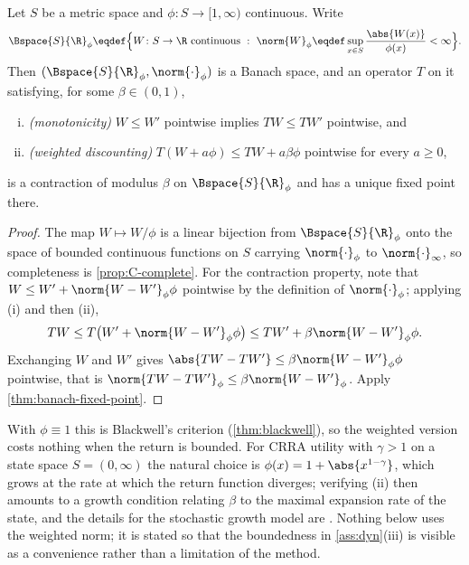 \begin{theorem}\label{thm:weighted-contraction}
	Let $S$ be a metric space and $\phi\colon S\to[1,\infty)$ continuous. Write
	\[
		\Bspace{S}{\R}_{\phi}\eqdef\Bigl\{W\colon S\to\R\ \text{continuous}\ :\
		\norm{W}_{\phi}\eqdef\sup_{x\in S}\frac{\abs{W(x)}}{\phi(x)}<\infty\Bigr\}.
	\]
	Then $(\Bspace{S}{\R}_{\phi},\norm{\cdot}_{\phi})$ is a Banach space, and an
	operator $T$ on it satisfying, for some $\beta\in(0,1)$,
	\begin{enumerate}[(i)]
		\item \emph{(monotonicity)} $W\leq W'$ pointwise implies $TW\leq TW'$
		      pointwise, and
		\item \emph{(weighted discounting)} $T(W+a\phi)\leq TW+a\beta\phi$ pointwise
		      for every $a\geq0$,
	\end{enumerate}
	is a contraction of modulus $\beta$ on $\Bspace{S}{\R}_{\phi}$ and has a unique
	fixed point there.
\end{theorem}

\begin{proof}
	The map $W\mapsto W/\phi$ is a linear bijection from $\Bspace{S}{\R}_{\phi}$
	onto the space of bounded continuous functions on $S$ carrying
	$\norm{\cdot}_{\phi}$ to $\norm{\cdot}_\infty$, so completeness is
	\autoref{prop:C-complete}. For the contraction property, note that
	$W\leq W'+\norm{W-W'}_{\phi}\phi$ pointwise by the definition of
	$\norm{\cdot}_{\phi}$; applying (i) and then (ii),
	\[
		TW\leq T\bigl(W'+\norm{W-W'}_{\phi}\phi\bigr)
		\leq TW'+\beta\norm{W-W'}_{\phi}\phi .
	\]
	Exchanging $W$ and $W'$ gives $\abs{TW-TW'}\leq\beta\norm{W-W'}_{\phi}\phi$
	pointwise, that is $\norm{TW-TW'}_{\phi}\leq\beta\norm{W-W'}_{\phi}$. Apply
	\autoref{thm:banach-fixed-point}.
\end{proof}

With $\phi\equiv1$ this is Blackwell's criterion (\autoref{thm:blackwell}),
so the weighted version costs nothing when the return is bounded. For CRRA
utility with $\gamma>1$ on a state space $S=(0,\infty)$ the natural choice is
$\phi(x)=1+\abs{x^{1-\gamma}}$, which grows at the rate at which the return
function diverges; verifying (ii) then amounts to a growth condition relating
$\beta$ to the maximal expansion rate of the state, and the details for the
stochastic growth model are \textcite[Ch.~4]{stokey1989recursive}. Nothing below
uses the weighted norm; it is stated so that the boundedness in
\autoref{ass:dyn}(iii) is visible as a convenience rather than a limitation of
the method.


